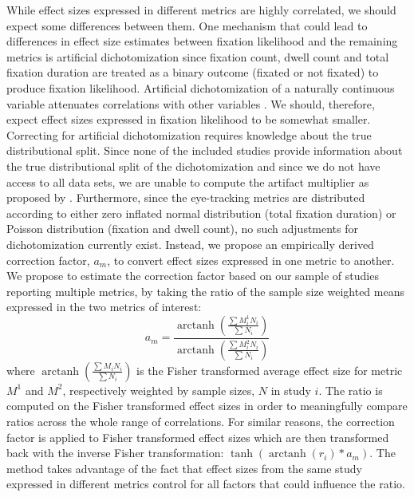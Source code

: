 \documentclass[english,natbib,man,floatsintext]{apa6}
\DeclareMathOperator\arctanh{arctanh}
\begin{document}
While effect sizes expressed in different metrics are highly correlated, we should expect some differences between them. One mechanism that could lead to differences in effect size estimates between fixation likelihood and the remaining metrics is artificial dichotomization since fixation count, dwell count and total fixation duration are treated as a binary outcome (fixated or not fixated) to produce fixation likelihood. Artificial dichotomization of a naturally continuous variable attenuates correlations with other variables \citep{hunter2004a}. We should, therefore, expect effect sizes expressed in fixation likelihood to be somewhat smaller. Correcting for artificial dichotomization requires knowledge about the true distributional split. Since none of the included studies provide information about the true distributional split of the dichotomization and since we do not have access to all data sets, we are unable to compute the artifact multiplier as proposed by \cite{hunter2004a}. Furthermore, since the eye-tracking metrics are distributed according to either zero inflated normal distribution (total fixation duration) or Poisson distribution (fixation and dwell count), no such adjustments for dichotomization currently exist. Instead, we propose an empirically derived correction factor, $a_m$, to convert effect sizes expressed in one metric to another. We propose to estimate the correction factor based on our sample of studies reporting multiple metrics, by taking the ratio of the sample size weighted means expressed in the two metrics of interest:
%
\begin{equation}
\label{eq:metrics_correction}
a_m = \frac{\arctanh \left( \frac{\sum M_i^1 N_i}{\sum N_i} \right)}{\arctanh \left( \frac{\sum M_i^2 N_i}{\sum N_i} \right)}
\end{equation}
%
where $\arctanh \left( \frac{\sum M_i N_i}{\sum N_i} \right)$ is the Fisher transformed average effect size for metric $M^1$ and $M^2$, respectively weighted by sample sizes, $N$ in study $i$. The ratio is computed on the Fisher transformed effect sizes in order to meaningfully compare ratios across the whole range of correlations. For similar reasons, the correction factor is applied to Fisher transformed effect sizes which are then transformed back with the inverse Fisher transformation: $\tanh(\arctanh(r_i)*a_m)$. The method takes advantage of the fact that effect sizes from the same study expressed in different metrics control for all factors that could influence the ratio.\\    
\end{document}
